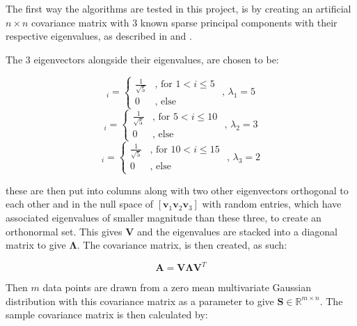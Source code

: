 \documentclass[11pt,a4paper]{article}
\begin{document}
The first way the algorithms are tested in this project, is by creating an artificial $n \times n$ covariance matrix with 3 known sparse principal components with their respective eigenvalues, as described in \cite{truncpower} and \cite{shen}. 

The 3 eigenvectors alongside their eigenvalues, are chosen to be:

\begin{equation*}
[\mathbf{v}_1]_i = \begin{cases}
       \frac{1}{\sqrt{5}} & \text{, for } 1<i\le 5 \\
       0 & \text{, else }
        \end{cases}
        \text{              , } \lambda_1 = 5
\end{equation*}
\begin{equation*}
[\mathbf{v}_2]_i = \begin{cases}
       \frac{1}{\sqrt{5}} & \text{, for } 5<i\le 10  \\
       0 & \text{, else }
        \end{cases}
        \text{              , } \lambda_2 = 3
\end{equation*}
\begin{equation*}
[\mathbf{v}_3]_i = \begin{cases}
       \frac{1}{\sqrt{5}} & \text{, for } 10<i\le 15  \\
       0 & \text{, else }
	  \end{cases}  
	  \text{              , } \lambda_3 = 2  
\end{equation*}
       
these are then put into columns along with two other eigenvectors orthogonal to each other and in the null space of $[\mathbf{v}_1 \mathbf{v}_2 \mathbf{v}_3]$ with random entries, which have associated eigenvalues of smaller magnitude than these three, to create an orthonormal set. This gives $\mathbf{V}$ and the eigenvalues are stacked into a diagonal matrix to give $\mathbf{\Lambda}$. The covariance matrix, is then created, as such:

\begin{equation*}
\mathbf{A} = \mathbf{V}\mathbf{\Lambda}\mathbf{V}^T
\end{equation*}


Then $m$ data points are drawn from a  zero mean multivariate Gaussian distribution  with this covariance matrix as a parameter to give $\mathbf{S} \in \mathbb{R}^{m \times n}$. The sample covariance matrix is then calculated by:
\end{document}
